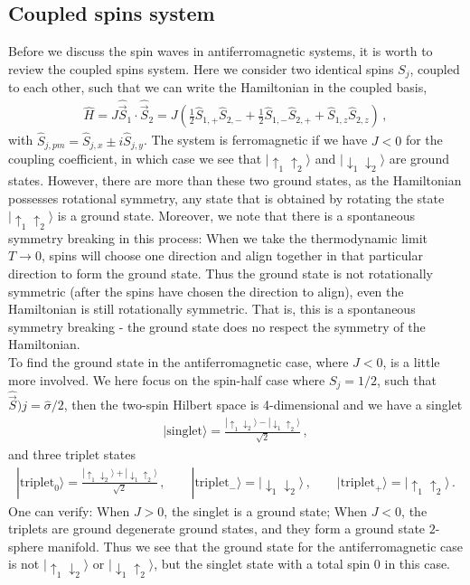\documentclass[11pt, onesided]{book}
\theoremstyle{break}
\theoremstyle{break}
\begin{document}
\subsection{Coupled spins system}
Before we discuss the spin waves in antiferromagnetic systems, it is worth to review the coupled spins system. Here we consider two identical spins $S_j$, coupled to each other, such that we can write the Hamiltonian in the coupled basis,
\begin{align*}
\hat{H} = J \hat{\vec{S}}_1 \cdot \hat{\vec{S}}_2 = J\left( \frac{1}{2}\hat{S}_{1,+}\hat{S}_{2,-} + \frac{1}{2}\hat{S}_{1,-}\hat{S}_{2,+} + \hat{S}_{1,z}\hat{S}_{2,z}\right)\,,
\end{align*}
with $\hat{S}_{j,pm} = \hat{S}_{j,x}\pm i \hat{S}_{j,y}$. The system is ferromagnetic if we have $J<0$ for the coupling coefficient, in which case we see that $|\uparrow_1\uparrow_2\rangle$ and $|\downarrow_1\downarrow_2\rangle$ are ground states. However, there are more than these two ground states, as the Hamiltonian possesses rotational symmetry, any state that is obtained by rotating the state $|\uparrow_1\uparrow_2\rangle$ is a ground state. Moreover, we note that there is a spontaneous symmetry breaking in this process: When we take the thermodynamic limit $T \to 0$, spins will choose one direction and align together in that particular direction to form the ground state. Thus the ground state is not rotationally symmetric (after the spins have chosen the direction to align), even the Hamiltonian is still rotationally symmetric. That is, this is a spontaneous symmetry breaking - the ground state does no respect the symmetry of the Hamiltonian.\\

To find the ground state in the antiferromagnetic case, where $J<0$, is a little more involved. We here focus on the spin-half case where $S_j=1/2$, such that $\hat{\vec{S}})j = \hat{\sigma}/2$, then the two-spin Hilbert space is 4-dimensional and we have a singlet 
\begin{align*}
|\text{singlet}\rangle = \frac{|\uparrow_1\downarrow_2\rangle - |\downarrow_1\uparrow_2\rangle}{\sqrt{2}}\,,
\end{align*}
and three triplet states
\begin{align*}
|\text{triplet}_0\rangle = \frac{|\uparrow_1\downarrow_2\rangle + |\downarrow_1\uparrow_2\rangle}{\sqrt{2}}\,,\qquad
|\text{triplet}_-\rangle = |\downarrow_1\downarrow_2\rangle\,,\qquad
|\text{triplet}_+\rangle = |\uparrow_1\uparrow_2\rangle\,.
\end{align*}
One can verify: When $J>0$, the singlet is a ground state; When $J<0$, the triplets are ground degenerate ground states, and they form a ground state $2$-sphere manifold. Thus we see that the ground state for the antiferromagnetic case is not $|\uparrow_1\downarrow_2\rangle$ or $|\downarrow_1\uparrow_2\rangle$, but the singlet state with a total spin $0$ in this case.\\
\end{document}
